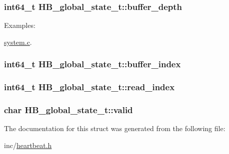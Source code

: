 \hypertarget{structHB__global__state__t_a9ca882a3705b1966c29b583f8d29038}{
\subsubsection[buffer\_\-depth]{\setlength{\rightskip}{0pt plus 5cm}int64\_\-t {\bf HB\_\-global\_\-state\_\-t::buffer\_\-depth}}}
\label{structHB__global__state__t_a9ca882a3705b1966c29b583f8d29038}


\begin{Desc}
\item[Examples: ]\par
\hyperlink{system_8c-example}{system.c}.\end{Desc}
\hypertarget{structHB__global__state__t_0169d181b2b325ca797d36804e7d36f7}{
\subsubsection[buffer\_\-index]{\setlength{\rightskip}{0pt plus 5cm}int64\_\-t {\bf HB\_\-global\_\-state\_\-t::buffer\_\-index}}}
\label{structHB__global__state__t_0169d181b2b325ca797d36804e7d36f7}


\hypertarget{structHB__global__state__t_0e0c007414f8172e548a0a47fd2830ac}{
\subsubsection[read\_\-index]{\setlength{\rightskip}{0pt plus 5cm}int64\_\-t {\bf HB\_\-global\_\-state\_\-t::read\_\-index}}}
\label{structHB__global__state__t_0e0c007414f8172e548a0a47fd2830ac}


\hypertarget{structHB__global__state__t_7ce5c2239f64dda6665d3a60c9262dc6}{
\subsubsection[valid]{\setlength{\rightskip}{0pt plus 5cm}char {\bf HB\_\-global\_\-state\_\-t::valid}}}
\label{structHB__global__state__t_7ce5c2239f64dda6665d3a60c9262dc6}




The documentation for this struct was generated from the following file:\begin{CompactItemize}
\item 
inc/\hyperlink{heartbeat_8h}{heartbeat.h}\end{CompactItemize}
